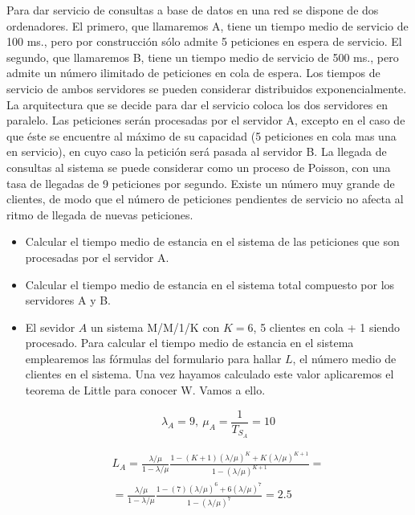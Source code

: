 
\begin{problem}[12]
Para dar servicio de consultas a base de datos en una red se dispone de dos ordenadores. El primero, que llamaremos A, tiene un tiempo medio de servicio de 100 ms., pero por construcción sólo admite 5 peticiones en espera de servicio. El segundo, que llamaremos B, tiene un tiempo medio de servicio de 500 ms., pero admite un número ilimitado de peticiones en cola de espera. Los tiempos de servicio de ambos servidores se pueden considerar distribuidos exponencialmente. La arquitectura que se decide para dar el servicio coloca los dos servidores en paralelo. Las peticiones serán procesadas por el servidor A, excepto en el caso de que éste se encuentre al máximo de su capacidad (5 peticiones en cola mas una en servicio), en cuyo caso la petición será pasada al servidor B. La llegada de consultas al sistema se puede considerar como un proceso de Poisson, con una tasa de llegadas de 9 peticiones por segundo. Existe un número muy grande de clientes, de modo que el número de peticiones pendientes de servicio no afecta al ritmo de llegada de nuevas peticiones.

\begin{itemize}
\item Calcular el tiempo medio de estancia en el sistema de las peticiones que son procesadas por el servidor A.
\item Calcular el tiempo medio de estancia en el sistema total compuesto por los servidores A y B.
\end{itemize}


\newpage
\solution

\yoP


\begin{itemize}
\item
El sevidor $A$ un sistema M/M/1/K con $K=6$, 5 clientes en cola + 1 siendo procesado. Para calcular el tiempo medio de estancia en el sistema emplearemos las fórmulas del formulario para hallar $L$, el número medio de clientes en el sistema. Una vez hayamos calculado este valor aplicaremos el teorema de Little para conocer W. Vamos a ello.

\[λ_A = 9, \ μ_A=\frac{1}{T_{S_A}}=10\]

\begin{multline*}L_A = \frac{λ/μ}{1-λ/μ}\frac{1-(K+1)(λ/μ)^K+K(λ/μ)^{K+1}}{1-(λ/μ)^{K+1}}=\\=\frac{λ/μ}{1-λ/μ}\frac{1-(7)(λ/μ)^6+6(λ/μ)^{7}}{1-(λ/μ)^{7}}=2.5\end{multline*}


\end{itemize}
\end{problem}
